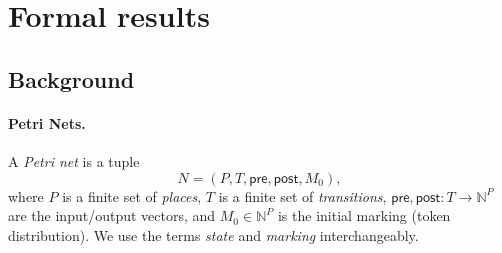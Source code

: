\section{Formal results}
\label{sec:formal-results}



\subsection{Background}

\paragraph{Petri Nets.}
A \emph{Petri net} is a tuple
\[
N = (P, T, \mathsf{pre}, \mathsf{post}, M_0),
\]
where \(P\) is a finite set of \emph{places}, \(T\) is a finite set of \emph{transitions},
\(\mathsf{pre},\mathsf{post}:T\to\mathbb N^P\) are the input/output vectors, and
\(M_0\in\mathbb N^P\) is the initial marking (token distribution). We use the terms \textit{state} and \textit{marking} interchangeably.

